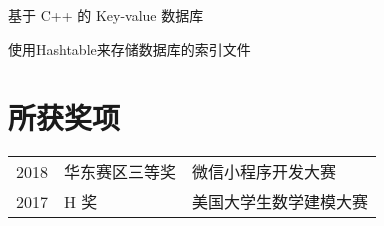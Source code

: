 \documentclass[]{deedy-resume-openfont}
\begin{document}
\begin{minipage}[t]{0.68\textwidth}
\descript{}
\begin{tightemize}
    \item 基于 C++ 的 Key-value 数据库
    \item 使用Hashtable来存储数据库的索引文件
\end{tightemize}
\sectionsep





\section{所获奖项} 
\begin{tabular}{rll}
2018         & 华东赛区三等奖  & 微信小程序开发大赛 \\
2017         & H 奖  & 美国大学生数学建模大赛 \\
\end{tabular}
\sectionsep


% 
% 

\end{minipage} 
\end{document}
